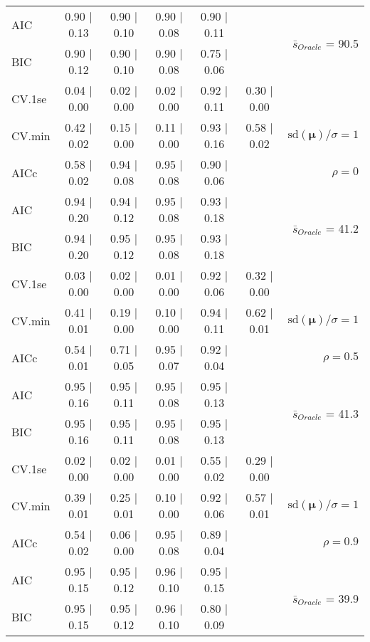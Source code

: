 \begin{table}
\begin{center}
\begin{tabular}{l*{5}{c}|r}
AIC & 0.90 $\mid$ 0.13 & 0.90 $\mid$ 0.10 & 0.90 $\mid$ 0.08 & 0.90 $\mid$ 0.11 & &  \multirow{2}{*}{$\bar{s}_{Oracle}$ = 90.5} \\
BIC & 0.90 $\mid$ 0.12 & 0.90 $\mid$ 0.10 & 0.90 $\mid$ 0.08 & 0.75 $\mid$ 0.06 & &  \\
 \hline 
CV.1se & 0.04 $\mid$ 0.00 & 0.02 $\mid$ 0.00 & 0.02 $\mid$ 0.00 & 0.92 $\mid$ 0.11 & 0.30 $\mid$ 0.00 & \\
CV.min & 0.42 $\mid$ 0.02 & 0.15 $\mid$ 0.00 & 0.11 $\mid$ 0.00 & 0.93 $\mid$ 0.16 & 0.58 $\mid$ 0.02 &  $\mathrm{sd}(\mathbf{\mu})/\sigma=1$ \\
AICc & 0.58 $\mid$ 0.02 & 0.94 $\mid$ 0.08 & 0.95 $\mid$ 0.08 & 0.90 $\mid$ 0.06 & & $\rho=0$ \\
AIC & 0.94 $\mid$ 0.20 & 0.94 $\mid$ 0.12 & 0.95 $\mid$ 0.08 & 0.93 $\mid$ 0.18 & &  \multirow{2}{*}{$\bar{s}_{Oracle}$ = 41.2} \\
BIC & 0.94 $\mid$ 0.20 & 0.95 $\mid$ 0.12 & 0.95 $\mid$ 0.08 & 0.93 $\mid$ 0.18 & &  \\
 \hline 
CV.1se & 0.03 $\mid$ 0.00 & 0.02 $\mid$ 0.00 & 0.01 $\mid$ 0.00 & 0.92 $\mid$ 0.06 & 0.32 $\mid$ 0.00 & \\
CV.min & 0.41 $\mid$ 0.01 & 0.19 $\mid$ 0.00 & 0.10 $\mid$ 0.00 & 0.94 $\mid$ 0.11 & 0.62 $\mid$ 0.01 &  $\mathrm{sd}(\mathbf{\mu})/\sigma=1$ \\
AICc & 0.54 $\mid$ 0.01 & 0.71 $\mid$ 0.05 & 0.95 $\mid$ 0.07 & 0.92 $\mid$ 0.04 & & $\rho=0.5$ \\
AIC & 0.95 $\mid$ 0.16 & 0.95 $\mid$ 0.11 & 0.95 $\mid$ 0.08 & 0.95 $\mid$ 0.13 & &  \multirow{2}{*}{$\bar{s}_{Oracle}$ = 41.3} \\
BIC & 0.95 $\mid$ 0.16 & 0.95 $\mid$ 0.11 & 0.95 $\mid$ 0.08 & 0.95 $\mid$ 0.13 & &  \\
 \hline 
CV.1se & 0.02 $\mid$ 0.00 & 0.02 $\mid$ 0.00 & 0.01 $\mid$ 0.00 & 0.55 $\mid$ 0.02 & 0.29 $\mid$ 0.00 & \\
CV.min & 0.39 $\mid$ 0.01 & 0.25 $\mid$ 0.01 & 0.10 $\mid$ 0.00 & 0.92 $\mid$ 0.06 & 0.57 $\mid$ 0.01 &  $\mathrm{sd}(\mathbf{\mu})/\sigma=1$ \\
AICc & 0.54 $\mid$ 0.02 & 0.06 $\mid$ 0.00 & 0.95 $\mid$ 0.08 & 0.89 $\mid$ 0.04 & & $\rho=0.9$ \\
AIC & 0.95 $\mid$ 0.15 & 0.95 $\mid$ 0.12 & 0.96 $\mid$ 0.10 & 0.95 $\mid$ 0.15 & &  \multirow{2}{*}{$\bar{s}_{Oracle}$ = 39.9} \\
BIC & 0.95 $\mid$ 0.15 & 0.95 $\mid$ 0.12 & 0.96 $\mid$ 0.10 & 0.80 $\mid$ 0.09 & &  \\

\end{tabular}
\end{center}
\end{table}
